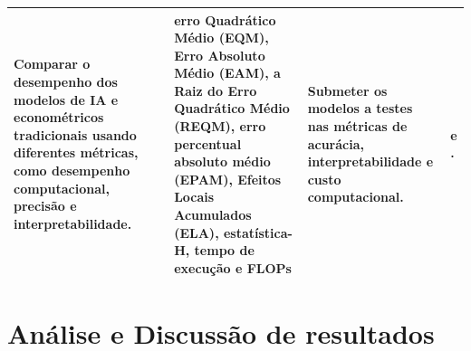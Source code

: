 \documentclass[12pt]{article}%
\begin{document}
\begin{table}[H]
{\begin{tabular}{p{4cm} p{5.0cm} p{3.5cm} p{4.6cm}}
			\hline
			Comparar o desempenho dos modelos de IA e econométricos tradicionais usando diferentes métricas, como desempenho computacional, precisão e interpretabilidade. & erro Quadrático Médio (EQM), Erro Absoluto Médio (EAM), a Raiz do Erro Quadrático Médio (REQM), erro percentual absoluto médio (EPAM), Efeitos Locais Acumulados (ELA), estatística-H, tempo de execução e FLOPs  & Submeter os modelos a testes nas métricas de acurácia, interpretabilidade e custo computacional. & \citeonline{rebelo2022interpretabilidade} e \citeonline{kava2022alem}.\\
			\hline 
		\end{tabular}
	}
	\end{table}


	
	
	
	
	\section{Análise e Discussão de resultados}
	
	
	
	
	
	\newpage
	
	
\end{document}
